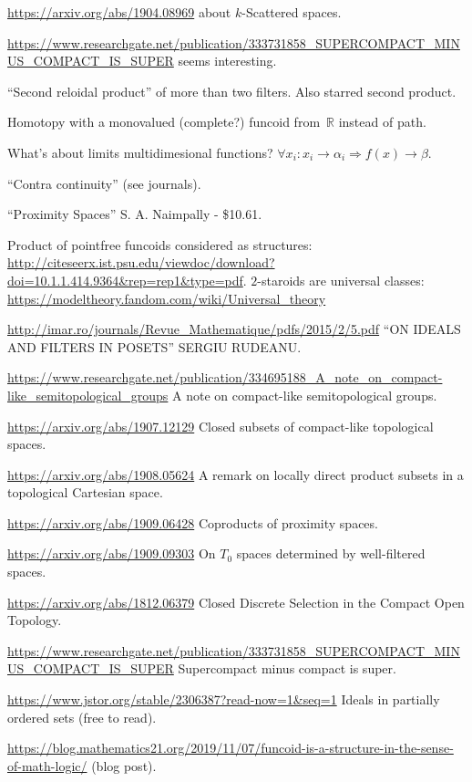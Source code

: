 \documentclass{amsart}
\begin{document}
\url{https://arxiv.org/abs/1904.08969} about $k$-Scattered spaces.

\url{https://www.researchgate.net/publication/333731858_SUPERCOMPACT_MINUS_COMPACT_IS_SUPER}
seems interesting.

``Second reloidal product'' of more than two filters.
Also starred second product.

Homotopy with a monovalued (complete?) funcoid from~$\mathbb{R}$
instead of path.

What's about limits multidimesional functions? $\forall x_i : x_i \rightarrow
\alpha_i \Rightarrow f (x) \rightarrow \beta$.

``Contra continuity'' (see journals).

``Proximity Spaces'' S. A. Naimpally - \$10.61.

Product of pointfree funcoids considered as structures:
\url{http://citeseerx.ist.psu.edu/viewdoc/download?doi=10.1.1.414.9364&rep=rep1&type=pdf}.
$2$-staroids are universal classes: \url{https://modeltheory.fandom.com/wiki/Universal_theory}

\url{http://imar.ro/journals/Revue_Mathematique/pdfs/2015/2/5.pdf}
``ON IDEALS AND FILTERS IN POSETS'' SERGIU RUDEANU.

\url{https://www.researchgate.net/publication/334695188_A_note_on_compact-like_semitopological_groups}
A note on compact-like semitopological groups.

\url{https://arxiv.org/abs/1907.12129} Closed subsets of compact-like topological spaces.

\url{https://arxiv.org/abs/1908.05624} A remark on locally direct product subsets in a topological Cartesian space.

\url{https://arxiv.org/abs/1909.06428} Coproducts of proximity spaces.

\url{https://arxiv.org/abs/1909.09303} On $T_0$ spaces determined by well-filtered spaces.

\url{https://arxiv.org/abs/1812.06379} Closed Discrete Selection in the Compact Open Topology.

\url{https://www.researchgate.net/publication/333731858_SUPERCOMPACT_MINUS_COMPACT_IS_SUPER}
Supercompact minus compact is super.

\url{https://www.jstor.org/stable/2306387?read-now=1&seq=1} Ideals in partially ordered sets (free to read).

\url{https://blog.mathematics21.org/2019/11/07/funcoid-is-a-structure-in-the-sense-of-math-logic/} (blog post).
\end{document}
